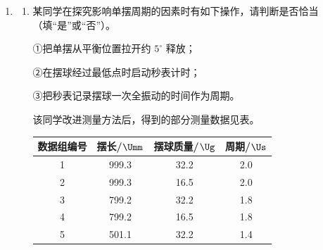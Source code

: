 \documentclass[\gkver]{gaokaozhenti}
\begin{document}
\begin{enumerate}
①a、b 从同种玻璃射向空气，a 的临界角小于 b 的临界角；

②用 b、c 和 d 在相同条件下分别做双缝干涉实验，c 的条纹间距最大；

③用 b、d 照射某金属表面，只有 b 能使其发射电子。

则可推断 a、b、c、d 可能分别是
{蓝光、紫光、红光、橙光}
{紫光、蓝光、橙光、红光}
{紫光、橙光、红光、蓝光}


\item
\begin{enumerate}
	\item
	某同学在探究影响单摆周期的因素时有如下操作，请判断是否恰当（填“是”或“否”）。

	①把单摆从平衡位置拉开约 $5^{\circ}$ 释放；\tkanswer[2.2cm]{}

	②在摆球经过最低点时启动秒表计时；\tkanswer[2.2cm]{}

	③把秒表记录摆球一次全振动的时间作为周期。\tkanswer[2.2cm]{}

	该同学改进测量方法后，得到的部分测量数据见表。

	\begin{center}
	\begin{tabular}{|c|c|c|c|}
	\hline
	数据组编号 & 摆长/$\Umm$ & 摆球质量/$\Ug$ & 周期/$\Us$ \\
	\hline
	1 & 999.3 & 32.2 & 2.0 \\
	\hline
	2 & 999.3 & 16.5 & 2.0 \\
	\hline
	3 & 799.2 & 32.2 & 1.8 \\
	\hline
	4 & 799.2 & 16.5 & 1.8 \\
	\hline
	5 & 501.1 & 32.2 & 1.4 \\
	\hline
	\end{tabular}
	\end{center}


\end{enumerate}
\end{enumerate}
\end{document}
